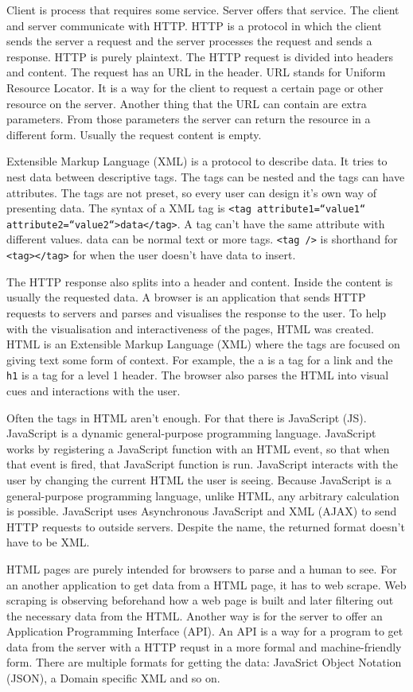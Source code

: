 Client is process that requires some service. Server offers that service. The client and server communicate with HTTP. HTTP is a protocol in which the client sends the server a request and the server processes the request and sends a response. HTTP is purely plaintext. The HTTP request is divided into headers and content. The request has an URL in the header. URL stands for Uniform Resource Locator. It is a way for the client to request a certain page or other resource on the server. Another thing that the URL can contain are extra parameters. From those parameters the server can return the resource in a different form. Usually the request content is empty.

Extensible Markup Language (XML) is a protocol to describe data. It tries to nest data between descriptive tags. The tags can be nested and the tags can have attributes. The tags are not preset, so every user can design it's own way of presenting data. The syntax of a XML tag is \texttt{<tag attribute1=“value1“ attribute2=“value2“>data</tag>}. A tag can't have the same attribute with different values. data can be normal text or more tags. \texttt{<tag />} is shorthand for \texttt{<tag></tag>} for when the user doesn't have data to insert.

The HTTP response also splits into a header and content. Inside the content is usually the requested data. A browser is an application that sends HTTP requests to servers and parses and visualises the response to the user. To help with the visualisation and interactiveness of the pages, HTML was created. HTML is an Extensible Markup Language (XML) where the tags are focused on giving text some form of context. For example, the a is a tag for a link and the \texttt{h1} is a tag for a level 1 header. The browser also parses the HTML into visual cues and interactions with the user.

Often the tags in HTML aren't enough. For that there is JavaScript (JS). JavaScript is a dynamic general-purpose programming language. JavaScript works by registering a JavaScript function with an HTML event, so that when that event is fired, that JavaScript function is run. JavaScript interacts with the user by changing the current HTML the user is seeing. Because JavaScript is a general-purpose programming language, unlike HTML, any arbitrary calculation is possible. JavaScript uses Asynchronous JavaScript and XML (AJAX) to send HTTP requests to outside servers. Despite the name, the returned format doesn't have to be XML.

HTML pages are purely intended for browsers to parse and a human to see. For an
another application to get data from a HTML page, it has to web scrape. Web
scraping is observing beforehand how a web page is built and later filtering out
the necessary data from the HTML. Another way is for the server to offer an
Application Programming Interface (API). An API is a way for a program to get
data from the server with a HTTP requst in a more formal and machine-friendly
form. There are multiple formats for getting the data: JavaSrict Object Notation
(JSON), a Domain specific XML and so on.

